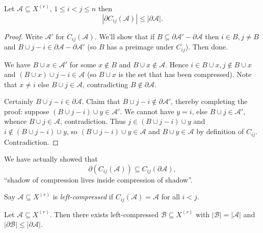 \documentclass[a4paper]{article}
\newcommand{\shadow}{\partial}
\begin{document}
\begin{proposition}
  Let \(\mathcal A \subseteq X^{(r)}\), \(1 \leq i < j \leq n\) then
  \[
    |\shadow C_{ij}(\mathcal A)| \leq |\shadow \mathcal A|.
  \]
\end{proposition}

\begin{proof}
  Write \(\mathcal A'\) for \(C_{ij} (\mathcal A)\). We'll show that if \(B \subseteq \shadow \mathcal A' - \shadow \mathcal A\) then \(i \in B, j \neq B\) and \(B \cup j - i \in \shadow \mathcal A - \shadow \mathcal A'\) (so \(B\) has a preimage under \(C_{ij}\)). Then done.

  We have \(B \cup x \in \mathcal A'\) for some \(x \notin B\) and \(B \cup x \notin \mathcal A\). Hence \(i \in B \cup x, j \notin B \cup x\) and \((B \cup x) \cup j - i \in \mathcal A\) (so \(B \cup x\) is the set that has been compressed). Note that \(x \neq i\) else \(B \cup j \in \mathcal A\), contradicting \(B \notin \shadow \mathcal A\).

  Certainly \(B \cup j - i \in \shadow \mathcal A\). Claim that \(B \cup j - i \notin \shadow \mathcal A'\), thereby completing the proof: suppose \((B \cup j - i) \cup y \in \mathcal A'\). We cannot have \(y = i\), else \(B \cup j \in \mathcal A'\), whence \(B \cup j \in \mathcal A\), contradiction. Thus \(j \in (B \cup j - i) \cup y\) and \(i \notin (B \cup j - i) \cup y\), so \((B \cup j - i) \cup y \in \mathcal A\) and \(B \cup y \in \mathcal A\) by definition of \(C_{ij}\). Contradiction.
\end{proof}

\begin{remark}
  We have actually showed that
  \[
    \shadow (C_{ij}(\mathcal A)) \subseteq C_{ij} (\shadow \mathcal A),
  \]
  ``shadow of compression lives inside compression of shadow''.
\end{remark}

\begin{definition}
  Say \(\mathcal A \subseteq X^{(r)}\) is \emph{left-compressed} if \(C_{ij}(\mathcal A) = \mathcal A\) for all \(i < j\).
\end{definition}

\begin{proposition}
  Let \(\mathcal A \subseteq X^{(r)}\). Then there exists left-compressed \(\mathcal B \subseteq X^{(r)}\) with \(|\mathcal B| = |\mathcal A|\) and \(|\shadow \mathcal B| \leq |\shadow \mathcal A|\).
\end{proposition}
\end{document}
